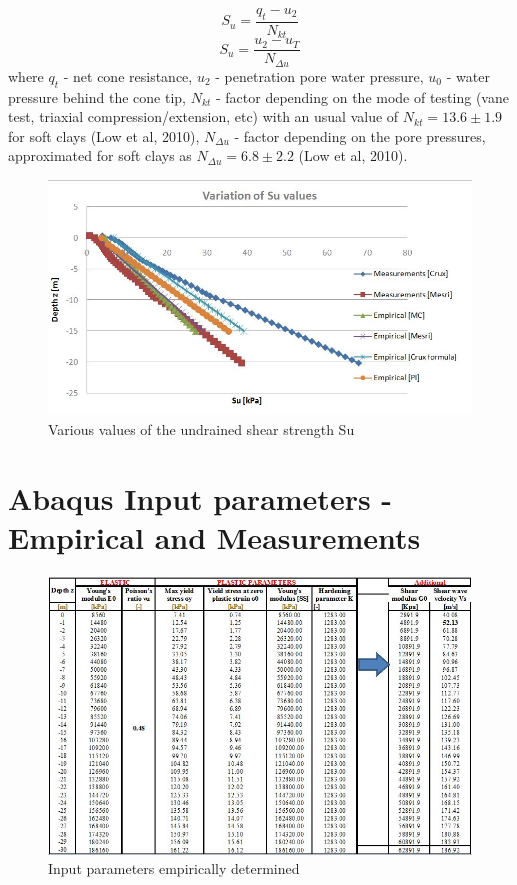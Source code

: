 \documentclass[10pt,a4paper]{report}
\begin{document}
\begin{enumerate}
\begin{equation}
S_u=\frac{q_t-u_2}{N_{kt}}
\end{equation}
\begin{equation}
S_u=\frac{u_2-u_T}{N_{\Delta u}}
\end{equation}
where $q_t$ - net cone resistance, $u_2$ - penetration pore water pressure, $u_0$ - water pressure behind the cone tip, $N_{kt}$ - factor depending on the mode of testing (vane test, triaxial compression/extension, etc) with an usual value of $N_{kt}=13.6\pm1.9$ for soft clays (Low et al, 2010), $N_{\Delta u}$ - factor depending on the pore pressures, approximated for soft clays as $N_{\Delta u}=6.8\pm2.2$ (Low et al, 2010).
\end{enumerate}
\begin{figure}[h!]
	\centering
	\includegraphics[width=0.45\linewidth]{"Su"}
	\caption{Various values of the undrained shear strength Su}
	\label{Su_2}
\end{figure}
	
\newpage
\chapter{Abaqus Input parameters - Empirical and Measurements} \label{App:AppendixF}

\begin{figure}[h!]
	\centering
	\includegraphics[width=1\linewidth]{"empirical"}
	\caption{Input parameters empirically determined}
	\label{empirical}
\end{figure}
\end{document}

